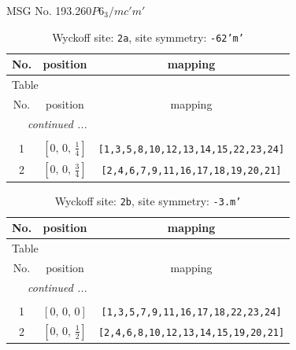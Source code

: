 \documentclass[fleqn,8pt]{jsarticle}
\begin{document}
\setcounter{MaxMatrixCols}{32}

\renewcommand{\tablename}{Table~}
\renewcommand{\figurename}{Figure~}
\begin{center}
\LARGE
MSG No. 193.260\quad$P6_{3}/mc'm'$
\end{center}
\renewcommand{\arraystretch}{1.2}
\begin{longtable}{ccc}
\caption{Wyckoff site: {\tt 2a}, site symmetry: {\tt -62'm'}}
 \\
 \hline \hline
No. & position & mapping \\ \hline \endfirsthead

\multicolumn{2}{l}{\tablename\ \thetable{}} \\
 \hline \hline
No. & position & mapping \\ \hline \endhead

 \hline \hline
\multicolumn{2}{r}{\footnotesize\it continued ...} \\ \endfoot

 \hline \hline
\multicolumn{2}{r}{} \\ \endlastfoot

1 & $\left[ 0,\, 0,\, \frac{1}{4} \right]$ & {\tt [1,3,5,8,10,12,13,14,15,22,23,24]} \\ \hline
2 & $\left[ 0,\, 0,\, \frac{3}{4} \right]$ & {\tt [2,4,6,7,9,11,16,17,18,19,20,21]} \\
\end{longtable}
\renewcommand{\arraystretch}{1.2}
\begin{longtable}{ccc}
\caption{Wyckoff site: {\tt 2b}, site symmetry: {\tt -3.m'}}
 \\
 \hline \hline
No. & position & mapping \\ \hline \endfirsthead

\multicolumn{2}{l}{\tablename\ \thetable{}} \\
 \hline \hline
No. & position & mapping \\ \hline \endhead

 \hline \hline
\multicolumn{2}{r}{\footnotesize\it continued ...} \\ \endfoot

 \hline \hline
\multicolumn{2}{r}{} \\ \endlastfoot

1 & $\left[ 0,\, 0,\, 0 \right]$ & {\tt [1,3,5,7,9,11,16,17,18,22,23,24]} \\ \hline
2 & $\left[ 0,\, 0,\, \frac{1}{2} \right]$ & {\tt [2,4,6,8,10,12,13,14,15,19,20,21]} \\
\end{longtable}
\end{document}

